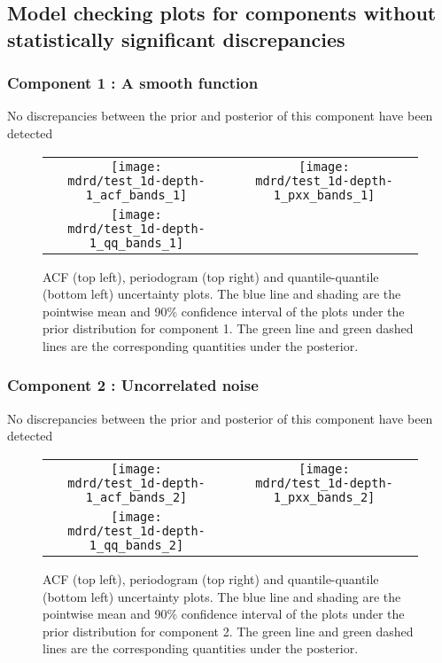 \documentclass{article} %
\begin{document}
\subsection{Model checking plots for components without statistically significant discrepancies}

\subsubsection{Component 1 : A smooth function}

No discrepancies between the prior and posterior of this component have been detected

\begin{figure}[H]
\newcommand{\wmgd}{0.5\columnwidth}
\newcommand{\hmgd}{3.0cm}
\newcommand{\mdrd}{test_1d-depth-1}
\newcommand{\mbm}{\hspace{-0.3cm}}
\begin{tabular}{cc}
\mbm \texttt{[image: \\mdrd/test\_1d-depth-1\_acf\_bands\_1]} & \texttt{[image: \\mdrd/test\_1d-depth-1\_pxx\_bands\_1]} \\
\mbm \texttt{[image: \\mdrd/test\_1d-depth-1\_qq\_bands\_1]}
\end{tabular}
\caption{
ACF (top left), periodogram (top right) and quantile-quantile (bottom left) uncertainty plots.
The blue line and shading are the pointwise mean and 90\% confidence interval of the plots under the prior distribution for component 1.
The green line and green dashed lines are the corresponding quantities under the posterior.}
\label{fig:check1}
\end{figure}

\subsubsection{Component 2 : Uncorrelated noise}

No discrepancies between the prior and posterior of this component have been detected

\begin{figure}[H]
\newcommand{\wmgd}{0.5\columnwidth}
\newcommand{\hmgd}{3.0cm}
\newcommand{\mdrd}{test_1d-depth-1}
\newcommand{\mbm}{\hspace{-0.3cm}}
\begin{tabular}{cc}
\mbm \texttt{[image: \\mdrd/test\_1d-depth-1\_acf\_bands\_2]} & \texttt{[image: \\mdrd/test\_1d-depth-1\_pxx\_bands\_2]} \\
\mbm \texttt{[image: \\mdrd/test\_1d-depth-1\_qq\_bands\_2]}
\end{tabular}
\caption{
ACF (top left), periodogram (top right) and quantile-quantile (bottom left) uncertainty plots.
The blue line and shading are the pointwise mean and 90\% confidence interval of the plots under the prior distribution for component 2.
The green line and green dashed lines are the corresponding quantities under the posterior.}
\label{fig:check2}
\end{figure}
\end{document}
